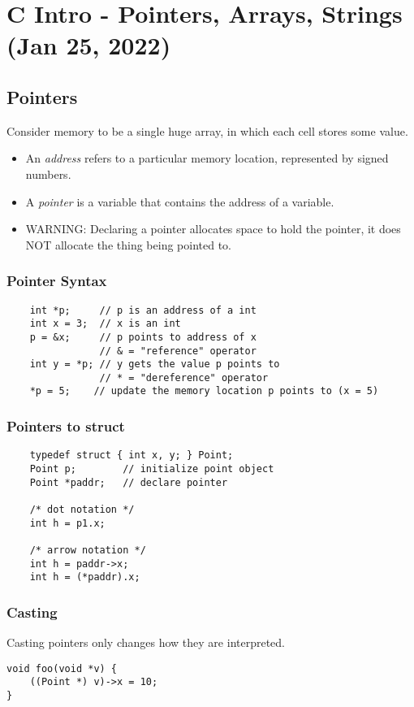 \chapter{C Intro - Pointers, Arrays, Strings (Jan 25, 2022)}
\section{Pointers}

Consider memory to be a single huge array, in which each cell stores some value.

\begin{itemize}
    \item An \emph{address} refers to a particular memory location, represented by signed numbers.
    \item A \emph{pointer} is a variable that contains the address of a variable.
    \item WARNING: Declaring a pointer allocates space to hold the pointer, it does NOT allocate the thing being pointed to.
\end{itemize}

\subsection{Pointer Syntax}
\begin{verbatim}
    int *p;     // p is an address of a int
    int x = 3;  // x is an int
    p = &x;     // p points to address of x
                // & = "reference" operator
    int y = *p; // y gets the value p points to
                // * = "dereference" operator
    *p = 5;    // update the memory location p points to (x = 5)
\end{verbatim}

\subsection{Pointers to struct}
\begin{verbatim}
    typedef struct { int x, y; } Point;
    Point p;        // initialize point object
    Point *paddr;   // declare pointer
    
    /* dot notation */
    int h = p1.x;
    
    /* arrow notation */
    int h = paddr->x;
    int h = (*paddr).x;
\end{verbatim}

\subsection{Casting}
Casting pointers only changes how they are interpreted.
\begin{verbatim}
void foo(void *v) {
    ((Point *) v)->x = 10;
}
\end{verbatim}

